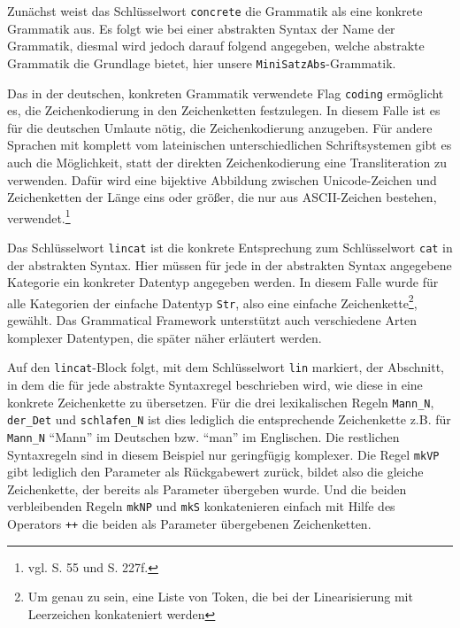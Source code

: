 

Zunächst weist das Schlüsselwort \texttt{concrete} die Grammatik als eine konkrete Grammatik aus. Es folgt wie bei einer abstrakten Syntax der Name der Grammatik, diesmal wird jedoch darauf folgend angegeben, welche abstrakte Grammatik die Grundlage bietet, hier unsere \texttt{MiniSatzAbs}-Grammatik. \par
Das in der deutschen, konkreten Grammatik verwendete Flag \texttt{coding} ermöglicht es, die Zeichenkodierung in den Zeichenketten festzulegen. In diesem Falle ist es für die deutschen Umlaute nötig, die Zeichenkodierung anzugeben. Für andere Sprachen mit komplett vom lateinischen unterschiedlichen Schriftsystemen gibt es auch die Möglichkeit, statt der direkten Zeichenkodierung eine Transliteration zu verwenden. Dafür wird eine bijektive Abbildung zwischen Unicode-Zeichen und Zeichenketten der Länge eins oder größer, die nur aus ASCII-Zeichen bestehen, verwendet.\footnote{vgl. \cite{RANTA2011} S. 55 und S. 227f.} \par
Das Schlüsselwort \texttt{lincat} ist die konkrete Entsprechung zum Schlüsselwort \texttt{cat} in der abstrakten Syntax. Hier müssen für jede in der abstrakten Syntax angegebene Kategorie ein konkreter Datentyp angegeben werden. In diesem Falle wurde für alle Kategorien der einfache Datentyp \texttt{Str}, also eine einfache Zeichenkette\footnote{Um genau zu sein, eine Liste von Token, die bei der Linearisierung mit Leerzeichen konkateniert werden}, gewählt. Das Grammatical Framework unterstützt auch verschiedene Arten komplexer Datentypen, die später näher erläutert werden. \par
Auf den \texttt{lincat}-Block folgt, mit dem Schlüsselwort \texttt{lin} markiert, der Abschnitt, in dem die für jede abstrakte Syntaxregel beschrieben wird, wie diese in eine konkrete Zeichenkette zu übersetzen. Für die drei lexikalischen Regeln \texttt{Mann\_N}, \texttt{der\_Det} und \texttt{schlafen\_N} ist dies lediglich die entsprechende Zeichenkette z.B. für \texttt{Mann\_N} "`Mann"' im Deutschen bzw. "`man"' im Englischen. Die restlichen Syntaxregeln sind in diesem Beispiel nur geringfügig komplexer. Die Regel \texttt{mkVP} gibt lediglich den Parameter als Rückgabewert zurück, bildet also die gleiche Zeichenkette, der bereits als Parameter übergeben wurde. Und die beiden verbleibenden Regeln \texttt{mkNP} und \texttt{mkS} konkatenieren einfach mit Hilfe des Operators \texttt{++} die beiden als Parameter übergebenen Zeichenketten. \par

